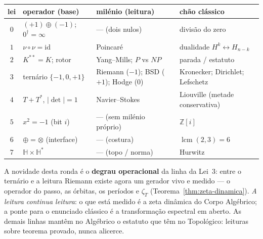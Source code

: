 \documentclass[livro.tex]{subfiles}
\begin{document}
\begin{center}\small
\begin{tabular}{@{}clll@{}}
lei & operador (base) & milénio (leitura) & chão clássico \\
\hline
$0$ & $(+1)\oplus(-1)$; $0^{\dagger}=\infty$ & --- (dois nulos) & divisão do zero \\
$1$ & $\nu\circ\nu=\mathrm{id}$ & Poincaré & dualidade $H^{k}\!\leftrightarrow\!H_{n-k}$ \\
$2$ & $K^{**}=K$; rotor & Yang--Mills; $P$ vs $NP$ & parada / estatuto \\
$3$ & ternário $\{-1,0,+1\}$ & Riemann ($-1$); BSD ($+1$); Hodge ($0$) & Kronecker; Dirichlet; Lefschetz \\
$4$ & $T+T^{*}$, $|\det|=1$ & Navier--Stokes & Liouville (metade conservativa) \\
$5$ & $x^{2}=-1$ (bit $i$) & --- (sem milénio próprio) & $\mathbb{Z}[i]$ \\
$6$ & $\oplus=\otimes$ (interface) & --- (costura) & $\operatorname{lcm}(2,3)=6$ \\
$7$ & $\mathbb{H}\times\mathbb{H}^{*}$ & --- (topo / norma) & Hurwitz \\
\end{tabular}
\end{center}

\noindent A novidade desta ronda é o \textbf{degrau operacional} da
linha da Lei~3: entre o ternário e a leitura Riemann existe agora um
gerador vivo e medido --- o operador do passo, as órbitas, os períodos e
$\zeta_{T}$ (Teorema~\ref{thm:zeta-dinamica}). \emph{A leitura continua
leitura}: o que está medido é a zeta dinâmica do Corpo Algébrico; a
ponte para o enunciado clássico é a transformação espectral em aberto.
As demais linhas mantêm no Algébrico o estatuto que têm no Topológico:
leituras sobre teorema provado, nunca alicerce.
\end{document}
